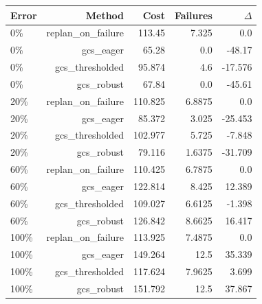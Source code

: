 \begin{tabular}{lrrrr}
\toprule
Error & Method & Cost & Failures & $\Delta$ \\
\midrule
0\% & replan\_on\_failure & 113.45 & 7.325 & 0.0 \\
0\% & gcs\_eager & 65.28 & 0.0 & -48.17 \\
0\% & gcs\_thresholded & 95.874 & 4.6 & -17.576 \\
0\% & gcs\_robust & 67.84 & 0.0 & -45.61 \\
20\% & replan\_on\_failure & 110.825 & 6.8875 & 0.0 \\
20\% & gcs\_eager & 85.372 & 3.025 & -25.453 \\
20\% & gcs\_thresholded & 102.977 & 5.725 & -7.848 \\
20\% & gcs\_robust & 79.116 & 1.6375 & -31.709 \\
60\% & replan\_on\_failure & 110.425 & 6.7875 & 0.0 \\
60\% & gcs\_eager & 122.814 & 8.425 & 12.389 \\
60\% & gcs\_thresholded & 109.027 & 6.6125 & -1.398 \\
60\% & gcs\_robust & 126.842 & 8.6625 & 16.417 \\
100\% & replan\_on\_failure & 113.925 & 7.4875 & 0.0 \\
100\% & gcs\_eager & 149.264 & 12.5 & 35.339 \\
100\% & gcs\_thresholded & 117.624 & 7.9625 & 3.699 \\
100\% & gcs\_robust & 151.792 & 12.5 & 37.867 \\
\bottomrule
\end{tabular}
